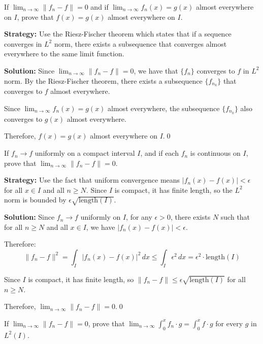 \begin{problembox}
If $\lim_{n \to \infty} \| f_n - f \| = 0$ and if $\lim_{n \to \infty} f_n(x) = g(x)$ almost everywhere on $I$, prove that $f(x) = g(x)$ almost everywhere on $I$.
\end{problembox}

\noindent\textbf{Strategy:} Use the Riesz-Fischer theorem which states that if a sequence converges in $L^2$ norm, there exists a subsequence that converges almost everywhere to the same limit function.

\bigskip\noindent\textbf{Solution:}
Since $\lim_{n \to \infty} \| f_n - f \| = 0$, we have that $\{f_n\}$ converges to $f$ in $L^2$ norm. By the Riesz-Fischer theorem, there exists a subsequence $\{f_{n_k}\}$ that converges to $f$ almost everywhere.

Since $\lim_{n \to \infty} f_n(x) = g(x)$ almost everywhere, the subsequence $\{f_{n_k}\}$ also converges to $g(x)$ almost everywhere.

Therefore, $f(x) = g(x)$ almost everywhere on $I$.\qed


\begin{problembox}
If $f_n \to f$ uniformly on a compact interval $I$, and if each $f_n$ is continuous on $I$, prove that $\lim_{n \to \infty} \| f_n - f \| = 0$.
\end{problembox}

\noindent\textbf{Strategy:} Use the fact that uniform convergence means $|f_n(x) - f(x)| < \epsilon$ for all $x \in I$ and all $n \geq N$. Since $I$ is compact, it has finite length, so the $L^2$ norm is bounded by $\epsilon \sqrt{\text{length}(I)}$.

\bigskip\noindent\textbf{Solution:}
Since $f_n \to f$ uniformly on $I$, for any $\epsilon > 0$, there exists $N$ such that for all $n \geq N$ and all $x \in I$, we have $|f_n(x) - f(x)| < \epsilon$.

Therefore:
\[\| f_n - f \|^2 = \int_I |f_n(x) - f(x)|^2 \, dx \leq \int_I \epsilon^2 \, dx = \epsilon^2 \cdot \text{length}(I)\]

Since $I$ is compact, it has finite length, so $\| f_n - f \| \leq \epsilon \sqrt{\text{length}(I)}$ for all $n \geq N$.

Therefore, $\lim_{n \to \infty} \| f_n - f \| = 0$.\qed


\begin{problembox}
If $\lim_{n \to \infty} \| f_n - f \| = 0$, prove that $\lim_{n \to \infty} \int_0^x f_n \cdot g = \int_0^x f \cdot g$ for every $g$ in $L^2(I)$.
\end{problembox}

